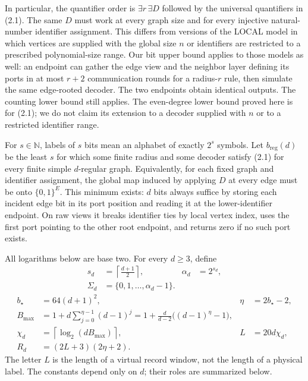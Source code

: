 \documentclass[11pt]{article}
\theoremstyle{definition}
\theoremstyle{remark}
\newcommand{\bits}{\{0,1\}}
\newcommand{\ceil}[1]{\left\lceil #1\right\rceil}
\newcommand{\N}{\mathbb N}
\begin{document}
In particular, the quantifier order is $\exists r\,\exists D$ followed by
the universal quantifiers in (2.1).  The same $D$ must work at every graph
size and for every injective natural-number identifier assignment.  This
differs from versions of the LOCAL model in which vertices are supplied
with the global size $n$ or identifiers are restricted to a prescribed
polynomial-size range.  Our bit upper bound applies to those models as
well: an endpoint can gather the edge view and the neighbor layer defining
its ports in at most $r+2$ communication rounds for a radius-$r$ rule, then simulate the same
edge-rooted decoder.  The two endpoints obtain identical outputs.
The counting lower bound still applies.  The even-degree
lower bound proved here is for (2.1); we do not claim its extension to a
decoder supplied with $n$ or to a restricted identifier range.

For $s\in\N$, labels of $s$ bits mean an alphabet of exactly $2^s$ symbols.
Let $b_{\mathrm{reg}}(d)$ be the least $s$ for which some finite radius and
some decoder satisfy (2.1) for every finite simple $d$-regular graph.
Equivalently, for each fixed graph and identifier assignment, the global map
induced by applying $D$ at every edge must be onto $\bits^E$.
This minimum exists: $d$ bits always suffice by storing each incident edge
bit in its port position and reading it at the lower-identifier endpoint.
On raw views it breaks identifier ties by local vertex index, uses the
first port pointing to the other root endpoint, and returns zero if no
such port exists.

All logarithms below are base two.  For every $d\ge3$, define
\begin{equation}
 \begin{aligned}
 s_d&=\ceil{\frac{d+1}{2}}, & \alpha_d&=2^{s_d},\\[-1mm]
 \Sigma_d&=\{0,1,\ldots,\alpha_d-1\}.&&
 \end{aligned}                                                \tag{2.2}
\end{equation}
\begin{align}
 b_\star&=64(d+1)^2, & \eta&=2b_\star-2,                     \tag{2.3}\\
 B_{\max}&=1+d\sum_{j=0}^{\eta-1}(d-1)^j
   =1+\frac d{d-2}\bigl((d-1)^\eta-1\bigr),                 \tag{2.4}\\
 \chi_d&=\ceil{\log_2(dB_{\max})},
 &L&=20d\chi_d,                                               \tag{2.5}\\
 R_d&=(2L+3)(2\eta+2).                                       \tag{2.6}
\end{align}
The letter $L$ is the length of a virtual record window, not the length of a
physical label.  The constants depend only on $d$; their roles are summarized
below.
\end{document}
